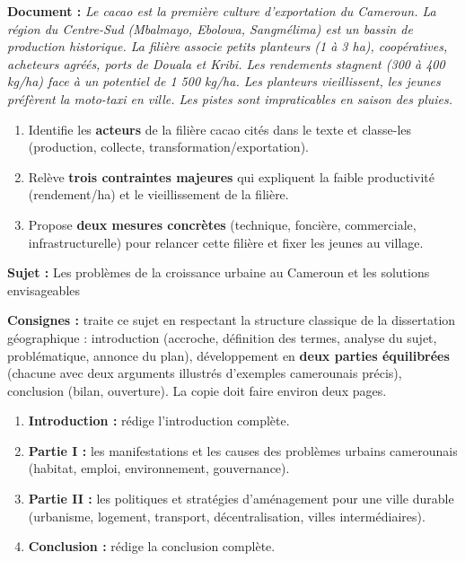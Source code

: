 \documentclass[11pt]{article}
\newcounter{popsec}
\newcounter{popsub}
\newcommand{\courssub}[1]{%
  \stepcounter{popsub}%
  \par\vspace{9pt}\noindent{\popxbold\fontsize{11.5}{13}\selectfont\color{popink}{\color{poporange}\thepopsec.\thepopsub}\hspace{6pt}#1}\par\nopagebreak\vspace{4pt}
}
\begin{document}
\begin{exercice}
\textbf{Document :} \emph{Le cacao est la première culture d'exportation du Cameroun. La région du Centre-Sud (Mbalmayo, Ebolowa, Sangmélima) est un bassin de production historique. La filière associe petits planteurs (1 à 3 ha), coopératives, acheteurs agréés, ports de Douala et Kribi. Les rendements stagnent (300 à 400 kg/ha) face à un potentiel de 1 500 kg/ha. Les planteurs vieillissent, les jeunes préfèrent la moto-taxi en ville. Les pistes sont impraticables en saison des pluies.}
\begin{enumerate}
\item Identifie les \textbf{acteurs} de la filière cacao cités dans le texte et classe-les (production, collecte, transformation/exportation).
\item Relève \textbf{trois contraintes majeures} qui expliquent la faible productivité (rendement/ha) et le vieillissement de la filière.
\item Propose \textbf{deux mesures concrètes} (technique, foncière, commerciale, infrastructurelle) pour relancer cette filière et fixer les jeunes au village.
\end{enumerate}
\end{exercice}

\courssub{Je me prépare au Bac}

\begin{exercice}
\textbf{Sujet :} \og Les problèmes de la croissance urbaine au Cameroun et les solutions envisageables \fg

\textbf{Consignes :} traite ce sujet en respectant la structure classique de la dissertation géographique : introduction (accroche, définition des termes, analyse du sujet, problématique, annonce du plan), développement en \textbf{deux parties équilibrées} (chacune avec deux arguments illustrés d'exemples camerounais précis), conclusion (bilan, ouverture). La copie doit faire environ deux pages.
\begin{enumerate}
\item \textbf{Introduction :} rédige l'introduction complète.
\item \textbf{Partie I :} les manifestations et les causes des problèmes urbains camerounais (habitat, emploi, environnement, gouvernance).
\item \textbf{Partie II :} les politiques et stratégies d'aménagement pour une ville durable (urbanisme, logement, transport, décentralisation, villes intermédiaires).
\item \textbf{Conclusion :} rédige la conclusion complète.
\end{enumerate}
\end{exercice}
\end{document}

